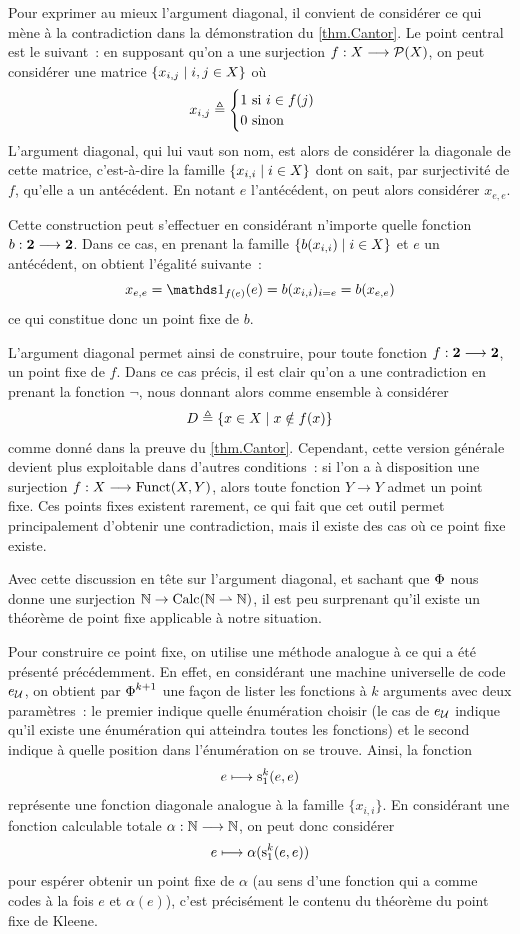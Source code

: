 Pour exprimer au mieux l'argument diagonal, il convient de considérer ce qui
mène à la contradiction dans la démonstration du \cref{thm.Cantor}. Le point
central est le suivant~: en supposant qu'on a une surjection
$f : \displaystyle X \longrightarrow \mathcal{P}(X)$, on peut considérer une matrice
$\left\{ x_{i,j} \;\middle\vert\; i,j \in X \right\}$ où
\[x_{i,j} \triangleq
\begin{cases} 1 \text{ si } i \in f(j) \\ 0 \text{ sinon} \end{cases}\]
L'argument diagonal, qui lui vaut son nom, est alors de considérer la diagonale
de cette matrice, c'est-à-dire la famille $\left\{ x_{i,i} \;\middle\vert\; i \in X \right\}$ dont on
sait, par surjectivité de $f$, qu'elle a un antécédent. En notant $e$
l'antécédent, on peut alors considérer $x_{e,e}$.

Cette construction peut s'effectuer en considérant n'importe quelle fonction
$b : \displaystyle \bm{2} \longrightarrow \bm{2}$. Dans ce cas, en prenant la famille
$\left\{ b(x_{i,i}) \;\middle\vert\; i \in X \right\}$ et $e$ un antécédent, on obtient l'égalité
suivante~:
\[x_{e,e} = \indicP{f(e)}(e) = b(x_{i,i})_{i = e} = b(x_{e,e})\]
ce qui constitue donc un point fixe de $b$.

L'argument diagonal permet ainsi de construire, pour toute fonction
$f : \displaystyle \bm{2} \longrightarrow \bm{2}$, un point fixe de $f$. Dans ce cas précis, il
est clair qu'on a une contradiction en prenant la fonction $\lnot$, nous
donnant alors comme ensemble à considérer
\[D \triangleq \left\{ x \in X \;\middle\vert\; x \notin f(x) \right\}\]
comme donné dans la preuve du \cref{thm.Cantor}. Cependant, cette version
générale devient plus exploitable dans d'autres conditions~: si l'on a à
disposition une surjection $f : \displaystyle X \longrightarrow \operatorname{Funct}(X,Y)$, alors toute
fonction $Y \to Y$ admet un point fixe. Ces points fixes existent rarement,
ce qui fait que cet outil permet principalement d'obtenir une contradiction,
mais il existe des cas où ce point fixe existe.

Avec cette discussion en tête sur l'argument diagonal, et sachant que
$\operatorname{\Phi}$ nous donne une surjection $\mathbb N \to \operatorname{Calc}(\mathbb N \rightharpoonup \mathbb N)$, il est
peu surprenant qu'il existe un théorème de point fixe applicable à notre
situation.

Pour construire ce point fixe, on utilise une méthode analogue à ce qui a été
présenté précédemment. En effet, en considérant une machine universelle de code
$e_{\mathcal{U}}$, on obtient par $\operatorname{\Phi}_{}^{k+1}$ une façon de lister les fonctions à
$k$ arguments avec deux paramètres~: le premier indique quelle énumération
choisir (le cas de $e_{\mathcal{U}}$ indique qu'il existe une énumération qui atteindra
toutes les fonctions) et le second indique à quelle position dans l'énumération
on se trouve. Ainsi, la fonction
\[e \longmapsto \mathrm{s}_{1}^{k}(e,e)\]
représente une fonction diagonale analogue à la famille $\{x_{i,i}\}$. En
considérant une fonction calculable totale $\alpha : \displaystyle \mathbb N \longrightarrow \mathbb N$, on
peut donc considérer
\[e \longmapsto \alpha(\mathrm{s}_{1}^{k}(e,e))\]
pour espérer obtenir un point fixe de $\alpha$ (au sens d'une fonction qui
a comme codes à la fois $e$ et $\alpha(e)$), c'est précisément le contenu du
théorème du point fixe de Kleene.

